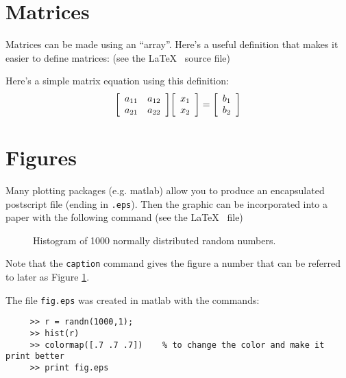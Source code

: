 \section{Matrices}

Matrices can be made using an ``array''.  Here's a useful definition that 
makes it easier to define matrices:  (see the \LaTeX~ source file)
\newenvironment{mat}{\left[\begin{array}{ccccccccccccc}}{\end{array}\right]}

Here's a simple matrix equation using this definition:
\begin{equation}
\begin{mat} a_{11} & a_{12} \\ a_{21} & a_{22} \end{mat}
\begin{mat} x_1\\ x_2 \end{mat}
= \begin{mat} b_1\\ b_2 \end{mat}
\label{matrixequation}
\end{equation}

\section{Figures}
Many plotting packages (e.g. matlab) allow you to produce an encapsulated
postscript file (ending in {\tt .eps}).   Then the graphic can be incorporated
into a paper with the following command (see the \LaTeX~ file)

\begin{figure}
\hfil{}\hfil
\caption{\label{figlabel} Histogram of 1000 normally distributed random
numbers.}
\end{figure}

Note that the {\tt caption} command gives the figure a number that can be referred
to later as Figure \ref{figlabel}.

The file {\tt fig.eps} was created in matlab with the commands:
\begin{verbatim}
     >> r = randn(1000,1);
     >> hist(r)             
     >> colormap([.7 .7 .7])    % to change the color and make it print better
     >> print fig.eps
\end{verbatim}



